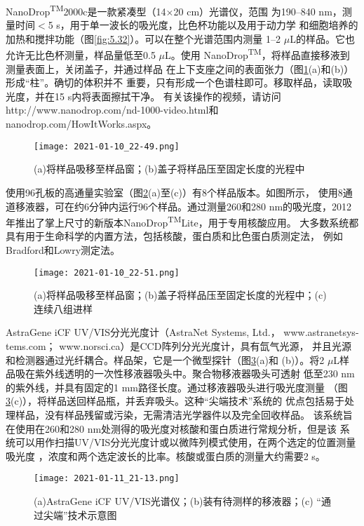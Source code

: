 NanoDrop\textsuperscript{TM}2000c是一款紧凑型（14$\times$20 cm）光谱仪，范围
为190--840 nm，测量时间$<$5 s，用于单一波长的吸光度，比色杯功能以及用于动力学
和细胞培养的加热和搅拌功能（图\ref{fig:5.32}）。可以在整个光谱范围内测量
1--2 $\mu$L的样品。它也允许无比色杯测量，样品量低至0.5 $\mu$L。使用
NanoDrop\textsuperscript{TM}，将样品直接移液到测量表面上，关闭盖子，并通过样品
在上下支座之间的表面张力（图\ref{fig:5.33}(a)和(b)）形成“柱”。确切的体积并不
重要，只有形成一个色谱柱即可。移取样品，读取吸光度，并在15 s内将表面擦拭干净。
有关该操作的视频，请访问http://www.nanodrop.com/nd-1000-video.html和
nanodrop.com/HowItWorks.aspx。
\begin{figure}[htpb]
    \centering
    \texttt{[image: 2021-01-10\_22-49.png]}
    \caption{(a)将样品吸移至样品窗；(b)盖子将样品压至固定长度的光程中}
    \label{fig:5.33}
\end{figure}

使用96孔板的高通量实验室（图\ref{fig:5.34}(a)至(c)）有8个样品版本。如图所示，
使用8通道移液器，可在约6分钟内运行96个样品。通过测量260和280 nm的吸光度，2012
年推出了掌上尺寸的新版本NanoDrop\textsuperscript{TM}Lite，用于专用核酸应用。 
大多数系统都具有用于生命科学的内置方法，包括核酸，蛋白质和比色蛋白质测定法，
例如Bradford和Lowry测定法。
\begin{figure}[htpb]
    \centering
    \texttt{[image: 2021-01-10\_22-51.png]}
    \caption{(a)将样品吸移至样品窗；(b)盖子将样品压至固定长度的光程中；(c)
    连续八组进样}
    \label{fig:5.34}
\end{figure}

AstraGene iCF UV/VIS分光光度计（AstraNet Systems, Ltd.，
www.astranetsys-tems.com； www.norsci.ca）是CCD阵列分光光度计，具有氙气光源，
并且光源和检测器通过光纤耦合。样品架，它是一个微型探针（图\ref{fig:5.35}(a)和
(b)）。将2 $\mu$L样品吸在紫外线透明的一次性移液器吸头中。聚合物移液器吸头可透射
低至230 nm的紫外线，并具有固定的1 mm路径长度。通过移液器吸头进行吸光度测量
（图\ref{fig:5.35}(c)），将样品送回样品瓶，并丢弃吸头。这种“尖端技术”系统的
优点包括易于处理样品，没有样品残留或污染，无需清洁光学器件以及完全回收样品。
该系统旨在使用在260和280 nm处测得的吸光度对核酸和蛋白质进行常规分析，但是该
系统可以用作扫描UV/VIS分光光度计或以微阵列模式使用，在两个选定的位置测量吸光度
，浓度和两个选定波长的比率。核酸或蛋白质的测量大约需要2 s。
\begin{figure}[htpb]
    \centering
    \texttt{[image: 2021-01-11\_21-13.png]}
    \caption{(a)AstraGene iCF UV/VIS光谱仪；(b)装有待测样的移液器；(c)
    “通过尖端”技术示意图}
    \label{fig:5.35}
\end{figure}
